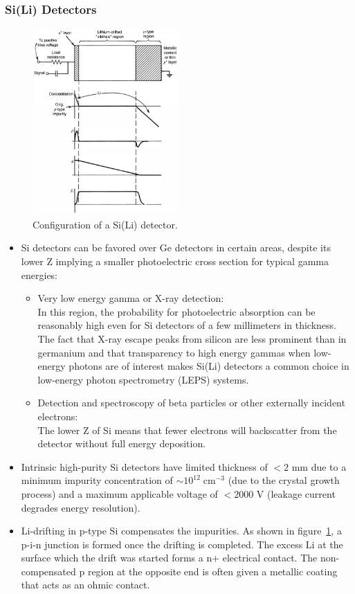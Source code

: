 \subsubsection{Si(Li) Detectors}
\begin{figure}[ht]
    \centering
    \includegraphics[width=0.5\textwidth]{images/SiLi_Detector.png}
    \caption{Configuration of a Si(Li) detector.}
    \label{fig:SiLi_Detector}
\end{figure}
\begin{itemize}
    \item Si detectors can be favored over Ge detectors in certain areas, despite its lower Z implying a smaller photoelectric cross section for typical gamma energies:
    \begin{itemize}
        \item Very low energy gamma or X-ray detection:\\
        In this region, the probability for photoelectric absorption can be reasonably high even for Si detectors of a few millimeters in thickness. The fact that X-ray escape peaks from silicon are less prominent than in germanium and that transparency to high energy gammas when low-energy photons are of interest makes Si(Li) detectors a common choice in low-energy photon spectrometry (LEPS) systems. 
        \item Detection and spectroscopy of beta particles or other externally incident electrons:\\
        The lower Z of Si means that fewer electrons will backscatter from the detector without full energy deposition. 
    \end{itemize}
    \item Intrinsic high-purity Si detectors have limited thickness of $<2$ mm due to a minimum impurity concentration of $\sim10^{12}\;\text{cm}^{-3}$ (due to the crystal growth process) and a maximum applicable voltage of $<2000$ V (leakage current degrades energy resolution). 
    \item Li-drifting in p-type Si compensates the impurities. As shown in figure~\ref{fig:SiLi_Detector}, a p-i-n junction is formed once the drifting is completed. The excess Li at the surface which the drift was started forms a n+ electrical contact. The non-compensated p region at the opposite end is often given a metallic coating that acts as an ohmic contact. 
\end{itemize}
